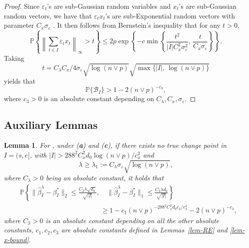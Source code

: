\documentclass[twoside]{article}
\newtheorem{lemma}[theorem]{Lemma}
\begin{document}
\begin{proof}
	Since $\varepsilon_t$'s are sub-Gaussian random variables and $x_t$'s are sub-Gaussian random vectors, we have that $\varepsilon_t x_t$'s are sub-Exponential random vectors with parameter $C_x \sigma_{\varepsilon}$ \citep[see e.g.~Lemma~2.7.7 in][]{vershynin2018high}.  It then follows from Bernstein's inequality \citep[see e.g.~Theorem~2.8.1 in][]{vershynin2018high} that for any $t > 0$,
		\[
			\mathbb{P}\left\{\left\|\sum_{t \in I} \varepsilon_t x_t \right\|_{\infty} > t\right\} \leq 2p \exp\left\{-c \min\left\{\frac{t^2}{|I|C_x^2\sigma^2_{\varepsilon}}, \, \frac{t}{C_x \sigma_{\varepsilon}}\right\}\right\}.
		\]
		Taking 
		\[
			t = C_{\lambda}C_x/4 \sigma_{\varepsilon} \sqrt{\log(n \vee p)} \sqrt{\max\{|I|, \, \log(n \vee p)\}}
		\] 
		yields that 
		\[
			\mathbb{P}\{\mathcal{B}_I\} > 1 - 2(n \vee p)^{-c_3},
		\]
		where $c_3 > 0$ is an absolute constant depending on $C_{\lambda}, C_x, \sigma_{\varepsilon}$.
\end{proof}

\subsection{Auxiliary Lemmas}

\begin{lemma} \label{lemma:lasso}
For , under (\textbf{a}) and (\textbf{c}), if there exists no true change point in $I = (s, e]$, with $|I| > 288^2 C^2_x d_0 \log(n \vee p)/c_x^2$ and
	\[
		\lambda \geq \lambda_1 := C_{\lambda}\sigma_{\varepsilon} \sqrt{\log(n \vee p)},
	\] 
	where $C_{\lambda} >  0$ being an absolute constant, it holds that
	\begin{align*}
		& \mathbb{P}\left\{\bigl\|\widehat{\beta}^{\lambda}_I - \beta^*_I\bigr\|_2 \leq \frac{C_3 \lambda \sqrt{d_0}} {\sqrt{|I|}}, \quad \bigl\|\widehat{\beta}^{\lambda}_I - \beta^*_I\bigr\|_1 \leq \frac{C_3 \lambda d_0}{\sqrt{|I|}} \right\} \\
		& \hspace{5cm} \geq 	1 - c_1 (n \vee p)^{-288^2C_x^2d_0c_2/c_x^2} - 2(n \vee p)^{-c_3},
	\end{align*}
	where $C_3 > 0$ is an absolute constant depending on all the other absolute constants, $c_1, c_2, c_3$ are absolute constants defined in Lemmas~\ref{lem-RE} and \ref{lem-x-bound}.
\end{lemma}
\end{document}
